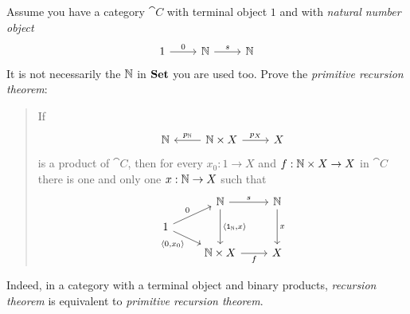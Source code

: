 \begin{exercise}
Assume you have a category \(\cat C\) with terminal object \(1\) and with {\em natural number object}
\[\begin{tikzcd}
1 \ar["0", r] & \naturals \ar["s", r] & \naturals
\end{tikzcd}\]
It is not necessarily the \(\mathbb N\) in \(\mathbf{Set}\) you are used too. Prove the {\em primitive recursion theorem}:
\begin{quotation}
If
\[\begin{tikzcd}
\naturals & \naturals \times X \ar["{p_\naturals}", l, swap] \ar["{p_X}", r] & X
\end{tikzcd}\]
is a product of \(\cat C\), then for every \(x_0 : 1 \to X\) and \(f : \mathbb N \times X \to X\) in \(\cat C\) there is one and only one \(x : \mathbb N \to X\) such that
\[\begin{tikzcd}[row sep=small]
& \naturals \ar["s", r] \ar["{\angled{\id_\naturals, x}}", dd] & \naturals \ar["x", dd] \\
1 \ar["0", ur] \ar["{\angled{0, x_0}}", dr, swap] \\
& \naturals \times X \ar["f", r, swap] & X
\end{tikzcd}\]
\end{quotation}
Indeed, in a category with a terminal object and binary products, {\em recursion theorem} is equivalent to {\em primitive recursion theorem}. 
\end{exercise}


